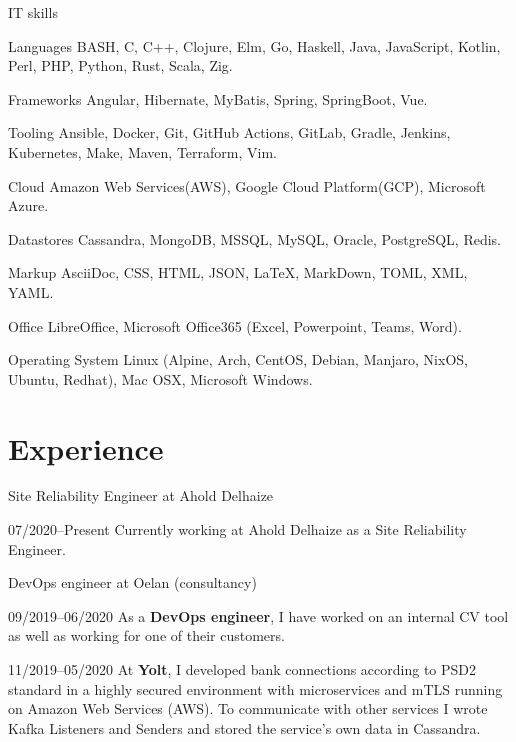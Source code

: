 \documentclass[11pt,a4paper]{article}
\begin{document}
\begin{cv}{}
	\vspace{.5em}

	\begin{cvlist}{IT skills}
		\item[Languages] BASH, C, C++, Clojure, Elm, Go, Haskell, Java, JavaScript,
		Kotlin, Perl, PHP, Python, Rust, Scala, Zig.
		\item[Frameworks] Angular, Hibernate, MyBatis, Spring, SpringBoot, Vue.
		\item[Tooling] Ansible, Docker, Git, GitHub Actions, GitLab, Gradle,
		Jenkins, Kubernetes, Make, Maven, Terraform, Vim.
		\item[Cloud] Amazon Web Services(AWS), Google Cloud Platform(GCP),
		Microsoft Azure.
		\item[Datastores] Cassandra, MongoDB, MSSQL, MySQL, Oracle, PostgreSQL,
		Redis.
		\item[Markup] AsciiDoc, CSS, HTML, JSON, {\LaTeX}, MarkDown, TOML, XML, YAML.
		\item[Office] LibreOffice, Microsoft Office365 (Excel, Powerpoint, Teams, Word).
		\item[Operating System] Linux (Alpine, Arch, CentOS, Debian, Manjaro,
		NixOS, Ubuntu, Redhat), Mac OSX, Microsoft Windows.
	\end{cvlist}

	\newpage

	\section{Experience}

	\begin{cvlist}{Site Reliability Engineer at Ahold Delhaize}
		\item[07/2020--Present] Currently working at Ahold Delhaize as a Site
		Reliability Engineer.
	\end{cvlist}

	\begin{cvlist}{DevOps engineer at Oelan (consultancy)}
		\item[09/2019--06/2020] As a \textbf{DevOps engineer}, I have worked on an
		internal CV tool as well as working for one of their customers.
		\item[\color{gray}11/2019--05/2020] At \textbf{Yolt}, I developed bank
		connections according to PSD2 standard in a highly secured environment with
		microservices and mTLS running on Amazon Web Services (AWS). To communicate
		with other services I wrote Kafka Listeners and Senders and stored the
		service's own data in Cassandra.
	\end{cvlist}


\end{cv}
\end{document}
